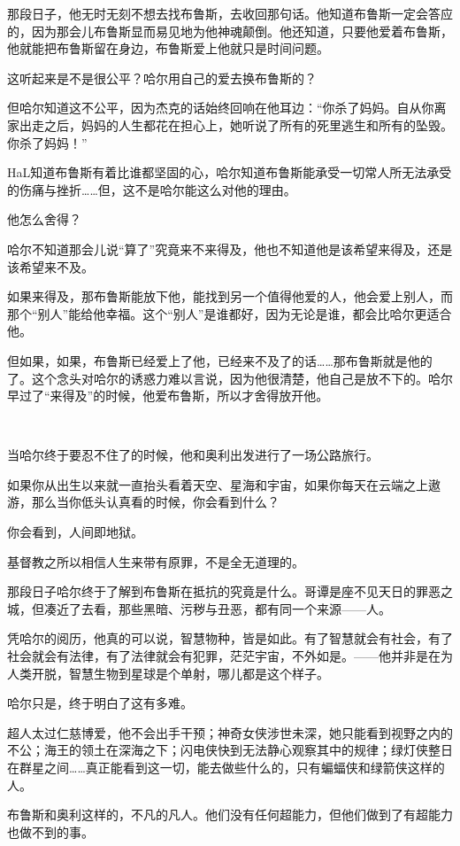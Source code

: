 \documentclass[../main]{subfiles}
\begin{document}
那段日子，他无时无刻不想去找布鲁斯，去收回那句话。他知道布鲁斯一定会答应的，因为那会儿布鲁斯显而易见地为他神魂颠倒。他还知道，只要他爱着布鲁斯，他就能把布鲁斯留在身边，布鲁斯爱上他就只是时间问题。

这听起来是不是很公平？哈尔用自己的爱去换布鲁斯的？

但哈尔知道这不公平，因为杰克的话始终回响在他耳边：“你杀了妈妈。自从你离家出走之后，妈妈的人生都花在担心上，她听说了所有的死里逃生和所有的坠毁。你杀了妈妈！”

HaL知道布鲁斯有着比谁都坚固的心，哈尔知道布鲁斯能承受一切常人所无法承受的伤痛与挫折……但，这不是哈尔能这么对他的理由。

他怎么舍得？

哈尔不知道那会儿说“算了”究竟来不来得及，他也不知道他是该希望来得及，还是该希望来不及。

如果来得及，那布鲁斯能放下他，能找到另一个值得他爱的人，他会爱上别人，而那个“别人”能给他幸福。这个“别人”是谁都好，因为无论是谁，都会比哈尔更适合他。

但如果，如果，布鲁斯已经爱上了他，已经来不及了的话……那布鲁斯就是他的了。这个念头对哈尔的诱惑力难以言说，因为他很清楚，他自己是放不下的。哈尔早过了“来得及”的时候，他爱布鲁斯，所以才舍得放开他。

~\

当哈尔终于要忍不住了的时候，他和奥利出发进行了一场公路旅行。

如果你从出生以来就一直抬头看着天空、星海和宇宙，如果你每天在云端之上遨游，那么当你低头认真看的时候，你会看到什么？

你会看到，人间即地狱。

基督教之所以相信人生来带有原罪，不是全无道理的。

那段日子哈尔终于了解到布鲁斯在抵抗的究竟是什么。哥谭是座不见天日的罪恶之城，但凑近了去看，那些黑暗、污秽与丑恶，都有同一个来源——人。

凭哈尔的阅历，他真的可以说，智慧物种，皆是如此。有了智慧就会有社会，有了社会就会有法律，有了法律就会有犯罪，茫茫宇宙，不外如是。——他并非是在为人类开脱，智慧生物到星球是个单射，哪儿都是这个样子。

哈尔只是，终于明白了这有多难。

超人太过仁慈博爱，他不会出手干预；神奇女侠涉世未深，她只能看到视野之内的不公；海王的领土在深海之下；闪电侠快到无法静心观察其中的规律；绿灯侠整日在群星之间……真正能看到这一切，能去做些什么的，只有蝙蝠侠和绿箭侠这样的人。

布鲁斯和奥利这样的，不凡的凡人。他们没有任何超能力，但他们做到了有超能力也做不到的事。
\end{document}
